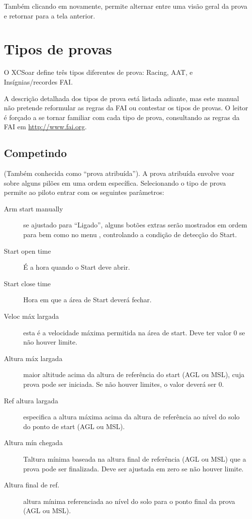 Também clicando em  novamente, permite alternar entre uma visão geral da prova e retornar para a tela anterior.  

\section{Tipos de provas}
O XCSoar define três tipos diferentes de prova: Racing, AAT, e Insígnias/recordes FAI.

A descrição detalhada dos tipos de prova está listada adiante, mas este manual não pretende reformular as regras da FAI ou contestar os tipos de provas.  O leitor é forçado a se tornar familiar com cada tipo de prova, consultando as regras da FAI em \url{http://www.fai.org}. 


\subsection*{Competindo}
(Também conhecida como “prova atribuída”).  A prova atribuída envolve voar sobre alguns pilões em uma ordem específica.  Selecionando o tipo de prova permite ao piloto entrar com os seguintes parâmetros: 
  \begin{description}
  \item [Arm start manually] se ajustado para “Ligado”, alguns botões extras serão mostrados em ordem para  bem como  no menu , controlando a condição de detecção do Start.
  \item [Start open time] É a hora quando o Start deve abrir. 
  \item [Start close time] Hora em que a área de Start deverá fechar.
  \item [Veloc máx largada] esta é a velocidade máxima permitida na área de start.  Deve ter valor 0 se não houver limite.
  \item [Altura máx largada] maior altitude acima da altura de referência do start (AGL ou MSL), cuja prova pode ser iniciada.  Se não houver limites, o valor deverá ser 0.
  \item [Ref altura largada] especifica a altura máxima acima da altura de referência ao nível do solo do ponto de start (AGL ou MSL).
  \item [Altura mín chegada] Taltura mínima baseada na altura final de referência (AGL ou MSL) que a prova pode ser finalizada.  Deve ser ajustada em zero se não houver limite. 
  \item [Altura final de ref.] altura mínima referenciada ao nível do solo para o ponto final da prova (AGL ou MSL).
  \end{description}
  

